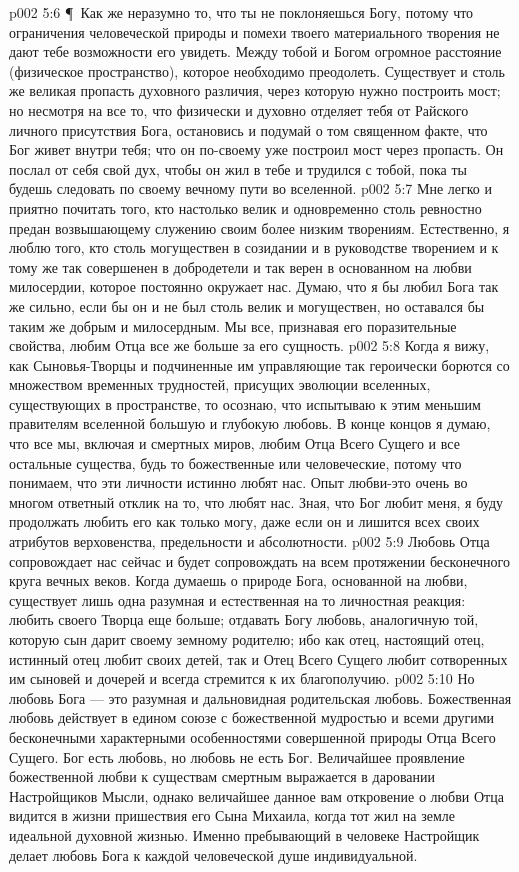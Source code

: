 \vs p002 5:6 \P\ Как же неразумно то, что ты не поклоняешься Богу, потому что ограничения человеческой природы и помехи твоего материального творения не дают тебе возможности его увидеть. Между тобой и Богом огромное расстояние (физическое пространство), которое необходимо преодолеть. Существует и столь же великая пропасть духовного различия, через которую нужно построить мост; но несмотря на все то, что физически и духовно отделяет тебя от Райского личного присутствия Бога, остановись и подумай о том священном факте, что Бог живет внутри тебя; что он по\hyp{}своему уже построил мост через пропасть. Он послал от себя свой дух, чтобы он жил в тебе и трудился с тобой, пока ты будешь следовать по своему вечному пути во вселенной.
\vs p002 5:7 Мне легко и приятно почитать того, кто настолько велик и одновременно столь ревностно предан возвышающему служению своим более низким творениям. Естественно, я люблю того, кто столь могуществен в созидании и в руководстве творением и к тому же так совершенен в добродетели и так верен в основанном на любви милосердии, которое постоянно окружает нас. Думаю, что я бы любил Бога так же сильно, если бы он и не был столь велик и могуществен, но оставался бы таким же добрым и милосердным. Мы все, признавая его поразительные свойства, любим Отца все же больше за его сущность.
\vs p002 5:8 Когда я вижу, как Сыновья\hyp{}Творцы и подчиненные им управляющие так героически борются со множеством временных трудностей, присущих эволюции вселенных, существующих в пространстве, то осознаю, что испытываю к этим меньшим правителям вселенной большую и глубокую любовь. В конце концов я думаю, что все мы, включая и смертных миров, любим Отца Всего Сущего и все остальные существа, будь то божественные или человеческие, потому что понимаем, что эти личности истинно любят нас. Опыт любви\hyp{}это очень во многом ответный отклик на то, что любят нас. Зная, что Бог любит меня, я буду продолжать любить его как только могу, даже если он и лишится всех своих атрибутов верховенства, предельности и абсолютности.
\vs p002 5:9 Любовь Отца сопровождает нас сейчас и будет сопровождать на всем протяжении бесконечного круга вечных веков. Когда думаешь о природе Бога, основанной на любви, существует лишь одна разумная и естественная на то личностная реакция: любить своего Творца еще больше; отдавать Богу любовь, аналогичную той, которую сын дарит своему земному родителю; ибо как отец, настоящий отец, истинный отец любит своих детей, так и Отец Всего Сущего любит сотворенных им сыновей и дочерей и всегда стремится к их благополучию.
\vs p002 5:10 Но любовь Бога --- это разумная и дальновидная родительская любовь. Божественная любовь действует в едином союзе с божественной мудростью и всеми другими бесконечными характерными особенностями совершенной природы Отца Всего Сущего. Бог есть любовь, но любовь не есть Бог. Величайшее проявление божественной любви к существам смертным выражается в даровании Настройщиков Мысли, однако величайшее данное вам откровение о любви Отца видится в жизни пришествия его Сына Михаила, когда тот жил на земле идеальной духовной жизнью. Именно пребывающий в человеке Настройщик делает любовь Бога к каждой человеческой душе индивидуальной.

